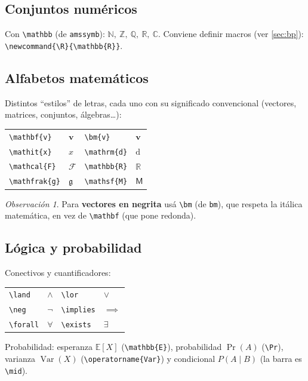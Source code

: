\documentclass[11pt,a4paper]{article}
\newcommand{\C}[1]{\texttt{\textbackslash #1}}   %
\newcommand{\R}{\mathbb{R}}  \newcommand{\N}{\mathbb{N}}
\newcommand{\Z}{\mathbb{Z}}  \newcommand{\Q}{\mathbb{Q}}  \newcommand{\Cc}{\mathbb{C}}
\theoremstyle{plain}      %
\theoremstyle{definition} %
\theoremstyle{remark}
\newtheorem*{obs}{Observación}
\begin{document}
\subsection{Conjuntos numéricos}
Con \C{mathbb} (de \texttt{amssymb}): $\N,\ \Z,\ \Q,\ \R,\ \mathbb{C}$. Conviene
definir macros (ver \cref{sec:bp}): \verb|\newcommand{\R}{\mathbb{R}}|.

\subsection{Alfabetos matemáticos}
Distintos \enquote{estilos} de letras, cada uno con su significado convencional
(vectores, matrices, conjuntos, álgebras\dots):
\begin{center}
\begin{tabular}{llll}
\toprule
\C{mathbf\{v\}} & $\mathbf{v}$ & \C{bm\{v\}} & $\bm{v}$ \\
\C{mathit\{x\}} & $\mathit{x}$ & \C{mathrm\{d\}} & $\mathrm{d}$ \\
\C{mathcal\{F\}} & $\mathcal{F}$ & \C{mathbb\{R\}} & $\mathbb{R}$ \\
\C{mathfrak\{g\}} & $\mathfrak{g}$ & \C{mathsf\{M\}} & $\mathsf{M}$ \\
\bottomrule
\end{tabular}
\end{center}
\begin{obs}
Para \textbf{vectores en negrita} usá \C{bm} (de \texttt{bm}), que respeta la
itálica matemática, en vez de \C{mathbf} (que pone redonda).
\end{obs}

\subsection{Lógica y probabilidad}
Conectivos y cuantificadores:
\begin{center}
\begin{tabular}{llll}
\toprule
\C{land} & $\land$ & \C{lor} & $\lor$ \\
\C{neg} & $\neg$ & \C{implies} & $\implies$ \\
\C{forall} & $\forall$ & \C{exists} & $\exists$ \\
\bottomrule
\end{tabular}
\end{center}
Probabilidad: esperanza $\mathbb{E}[X]$ (\C{mathbb\{E\}}), probabilidad
$\Pr(A)$ (\C{Pr}), varianza $\operatorname{Var}(X)$
(\C{operatorname\{Var\}}) y condicional $P(A\mid B)$ (la barra es \C{mid}).
\end{document}
